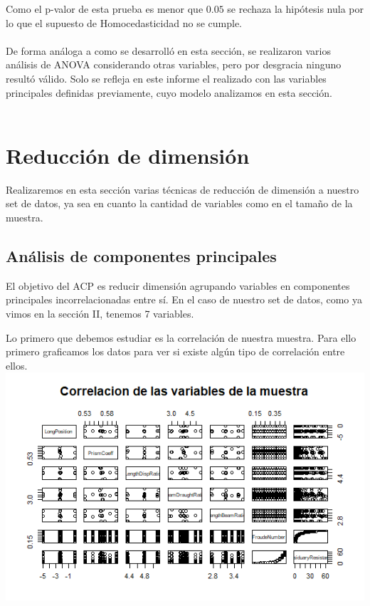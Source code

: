 \documentclass[twoside]{article}
\begin{document}
\begin{multicols}{2}
Como el p-valor de esta prueba es menor que $0.05$ se rechaza la hip\'otesis nula por lo que el supuesto de Homocedasticidad no se cumple.\\\\

De forma an\'aloga a como se desarroll\'o en esta secci\'on, se realizaron varios an\'alisis de ANOVA considerando otras variables, pero por desgracia ninguno result\'o v\'alido. Solo se refleja en este informe el realizado con las variables principales definidas previamente, cuyo modelo analizamos en esta secci\'on.\\\\




\section{Reducci\'on de dimensi\'on}
Realizaremos en esta secci\'on varias t\'ecnicas de reducci\'on de dimensi\'on a nuestro set de datos, ya sea en cuanto la cantidad de variables como en el tama\~no de la muestra.\\


\subsection{An\'alisis de componentes principales}
El objetivo del ACP es reducir dimensi\'on agrupando variables en componentes principales incorrelacionadas entre s\'i. En el caso de nuestro set de datos, como ya vimos en la secci\'on II, tenemos 7 variables.

Lo primero que debemos estudiar es la correlaci\'on de nuestra muestra. Para ello primero graficamos los datos para ver si existe alg\'un tipo de correlaci\'on entre ellos.\\

\includegraphics[scale = 0.4]{images/pic_21.png} \\


\end{multicols}
\end{document}
